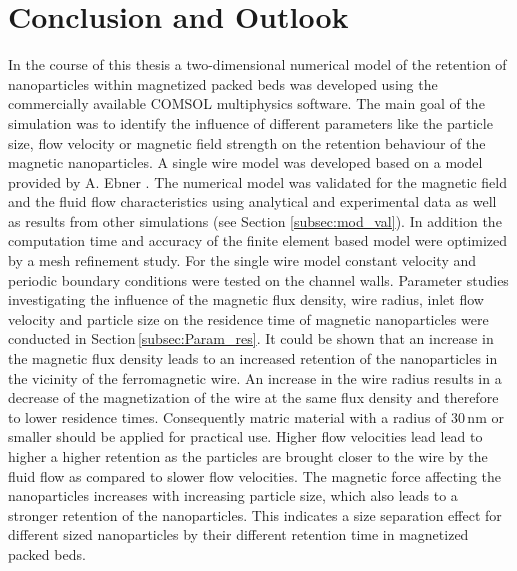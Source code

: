 
\chapter{Conclusion and Outlook}
\label{ch:Conclusion}

In the course of this thesis a two-dimensional numerical model of the retention of nanoparticles within magnetized packed beds was developed using the commercially available COMSOL multiphysics software. The main goal of the simulation was to identify the influence of different parameters like the particle size, flow velocity or magnetic field strength on the retention behaviour of the magnetic nanoparticles. 
A single wire model was developed based on a model provided by A. Ebner \cite{choomphon2017simulation}. The numerical model was validated for the magnetic field and the fluid flow characteristics using analytical and experimental data as well as results from other simulations (see Section \ref{subsec:mod_val}). In addition the computation time and accuracy of the finite element based model were optimized by a mesh refinement study. For the single wire model constant velocity and periodic boundary conditions were tested on the channel walls. Parameter studies investigating the influence of the magnetic flux density, wire radius, inlet flow velocity and particle size on the residence time of magnetic nanoparticles were conducted in Section\,\ref{subsec:Param_res}. It could be shown that an increase in the magnetic flux density leads to an increased retention of the nanoparticles in the vicinity of the ferromagnetic wire. An increase in the wire radius results in a decrease of the magnetization of the wire at the same flux density and therefore to lower residence times. Consequently matric material with a radius of 30\,nm or smaller should be applied for practical use. Higher flow velocities lead lead to higher a higher retention as the particles are brought closer to the wire by the fluid flow as compared to slower flow velocities. The magnetic force affecting the nanoparticles increases with increasing particle size, which also leads to a stronger retention of the nanoparticles. This indicates a size separation effect for different sized nanoparticles by their different retention time in magnetized packed beds.

